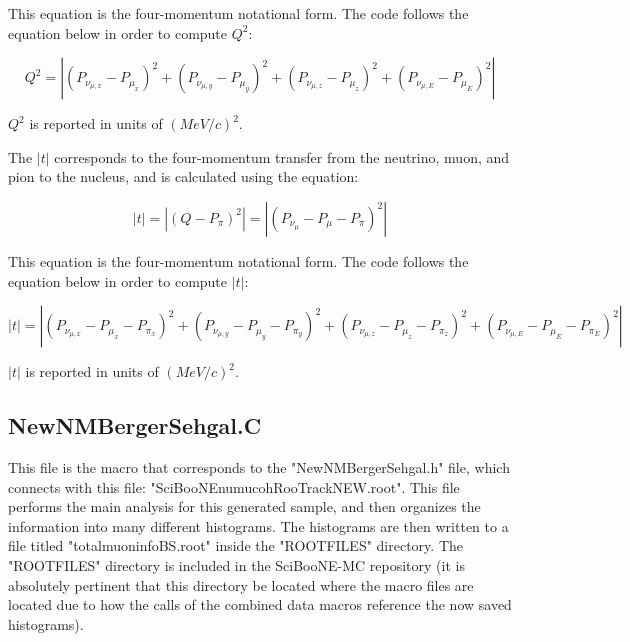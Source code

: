 \documentclass[11pt]{article}
\begin{document}
\noindent
This equation is the four-momentum notational form. The code follows the equation below in order to compute $Q^2$:

\begin{equation}
Q^2 = |(P_{\nu_{\mu,x}} - P_{\mu_x})^2 + (P_{\nu_{\mu,y}} - P_{\mu_y})^2 + (P_{\nu_{\mu,z}} - P_{\mu_z})^2 + (P_{\nu_{\mu,E}} - P_{\mu_E})^2|
\end{equation}

\noindent
$Q^2$ is reported in units of $(MeV/c)^2$.

The $|t|$ corresponds to the four-momentum transfer from the neutrino, muon, and pion to the nucleus, and is calculated using the equation:

\begin{equation}
|t| = |(Q - P_\pi)^2| = |(P_{\nu_\mu} - P_\mu - P_\pi)^2|
\end{equation}

\noindent
This equation is the four-momentum notational form. The code follows the equation below in order to compute $|t|$:

\begin{equation}
|t| = |(P_{\nu_{\mu,x}} - P_{\mu_x} - P_{\pi_x})^2 + (P_{\nu_{\mu,y}} - P_{\mu_y} - P_{\pi_y})^2 + (P_{\nu_{\mu,z}} - P_{\mu_z} - P_{\pi_z})^2 + (P_{\nu_{\mu,E}} - P_{\mu_E} - P_{\pi_E})^2|
\end{equation}

\noindent
$|t|$ is reported in units of $(MeV/c)^2$.

\subsection{NewNMBergerSehgal.C}
This file is the macro that corresponds to the "NewNMBergerSehgal.h" file, which connects with this file: "SciBooNE\textunderscore numu\textunderscore coh\textunderscore RooTrack\textunderscore NEW.root". This file performs the main analysis for this generated sample, and then organizes the information into many different histograms. The histograms are then written to a file titled "totalmuoninfoBS.root" inside the "ROOTFILES" directory. The "ROOTFILES" directory is included in the SciBooNE-MC repository (it is absolutely pertinent that this directory be located where the macro files are located due to how the calls of the combined data macros reference the now saved histograms).
\end{document}
